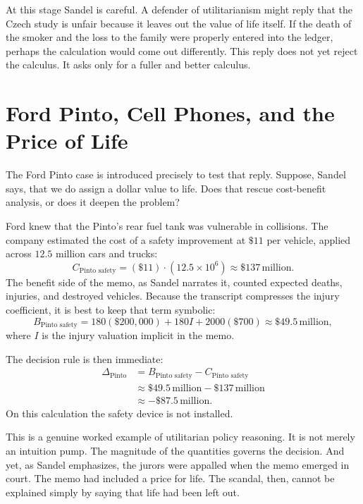 At this stage Sandel is careful. A defender of utilitarianism might reply that the Czech study is unfair because it leaves out the value of life itself. If the death of the smoker and the loss to the family were properly entered into the ledger, perhaps the calculation would come out differently. This reply does not yet reject the calculus. It asks only for a fuller and better calculus.

\section{Ford Pinto, Cell Phones, and the Price of Life}

The Ford Pinto case is introduced precisely to test that reply. Suppose, Sandel says, that we do assign a dollar value to life. Does that rescue cost-benefit analysis, or does it deepen the problem?

Ford knew that the Pinto's rear fuel tank was vulnerable in collisions. The company estimated the cost of a safety improvement at \(\$11\) per vehicle, applied across \(12.5\) million cars and trucks:
\begin{equation}
C_{\text{Pinto safety}}=(\$11)\cdot(12.5\times 10^6)\approx \$137\,\text{million}.
\end{equation}
The benefit side of the memo, as Sandel narrates it, counted expected deaths, injuries, and destroyed vehicles. Because the transcript compresses the injury coefficient, it is best to keep that term symbolic:
\begin{equation}
B_{\text{Pinto safety}}
=
180(\$200{,}000)+180I+2000(\$700)\approx \$49.5\,\text{million},
\end{equation}
where \(I\) is the injury valuation implicit in the memo.

The decision rule is then immediate:
\begin{align}
\Delta_{\text{Pinto}}
&=B_{\text{Pinto safety}}-C_{\text{Pinto safety}} \nonumber\\
&\approx \$49.5\,\text{million}-\$137\,\text{million} \nonumber\\
&\approx -\$87.5\,\text{million}.
\end{align}
On this calculation the safety device is not installed.

This is a genuine worked example of utilitarian policy reasoning. It is not merely an intuition pump. The magnitude of the quantities governs the decision. And yet, as Sandel emphasizes, the jurors were appalled when the memo emerged in court. The memo had included a price for life. The scandal, then, cannot be explained simply by saying that life had been left out.

